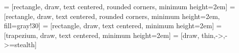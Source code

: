 \usepackage{tikz}
\usetikzlibrary{shapes, arrows, positioning, backgrounds}
 = [rectangle, draw, text centered, rounded corners, minimum height=2em]
 = [rectangle, draw, text centered, rounded corners, minimum height=2em, fill=gray!30]
 = [rectangle, draw, text centered, minimum height=2em]
 = [trapezium, draw, text centered, minimum height=2em]
 = [draw, thin,->,->=stealth]
